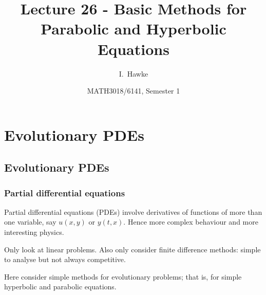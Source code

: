 \documentclass{beamer}
\title[Lecture 26] %
{Lecture 26 - Basic Methods for Parabolic and Hyperbolic Equations}
\author[I. Hawke] %
{I.~Hawke}
\institute[University of Southampton] %
{
  School of Mathematics, \\
  University of Southampton, UK
}
\date[Semester 1] %
{MATH3018/6141, Semester 1}
\begin{document}
\begin{frame}
  \titlepage
\end{frame}

\section{Evolutionary PDEs}

\subsection{Evolutionary PDEs}

\begin{frame}
  \frametitle{Partial differential equations}

  Partial differential equations (PDEs) involve derivatives of
  functions of more than one variable, say $u(x, y)$ or $y(t,
  x)$. Hence more complex behaviour and more interesting
  physics. \pause

  \vspace{1ex}

  Only look at linear problems.  Also only consider finite difference
  methods: simple to analyse but not always competitive. \pause

  \vspace{1ex}

  Here consider simple methods for evolutionary problems; that is, for
  simple hyperbolic and parabolic equations.

\end{frame}
\end{document}
